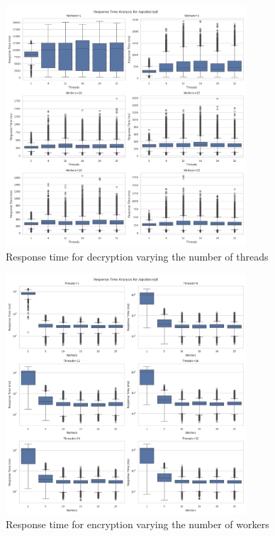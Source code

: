 \documentclass[cic,tc,english]{iiufrgs}
\begin{document}
            \begin{figure}
                \centering
                \includegraphics[width=0.8\textwidth]{images/phase1/api_decrypt/response_time_workers_summary.png}
                \caption{Response time for decryption varying the number of threads}
                \label{fig:decrypt_response_time_workers}
            \end{figure}

            \begin{figure}
                \centering
                \includegraphics[width=0.8\textwidth]{images/phase1/api_decrypt/response_time_threads_summary.png}
                \caption{Response time for encryption varying the number of workers}
                \label{fig:encrypt_response_time_threads}
            \end{figure}
\end{document}
